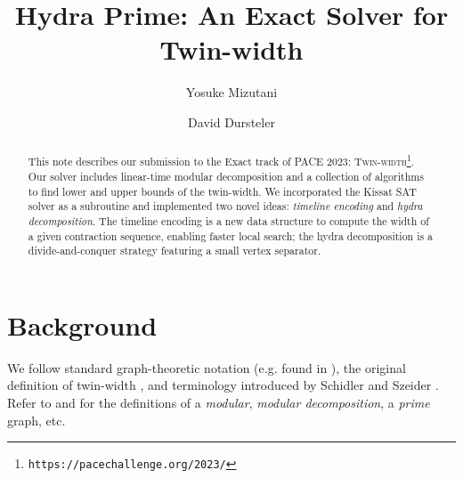 \documentclass[a4paper,UKenglish,cleveref, autoref, thm-restate]{lipics-v2021}
\title{Hydra Prime: An Exact Solver for Twin-width} %
\author{Yosuke Mizutani}{\universityOfUtah}{yos@cs.utah.edu}{https://orcid.org/0000-0002-9847-4890}{}
\author{David Dursteler}{\universityOfUtah}{u1161522@utah.edu}{https://orcid.org/0009-0000-6471-1504}{}
\begin{document}
\maketitle

\begin{abstract}
This note describes our submission to the Exact track of PACE 2023:
 \textsc{Twin-width}\footnote{%
\texttt{https://pacechallenge.org/2023/}}.
%
Our solver includes linear-time modular decomposition and
a collection of algorithms to find lower and upper bounds of the twin-width.
%
We incorporated the \textsf{Kissat} SAT solver \cite{biere_gimsatul_2022} as a subroutine
and implemented two novel ideas:
\emph{timeline encoding} and \emph{hydra decomposition}.
%
The timeline encoding is a new data structure to compute the width of a given contraction
sequence, enabling faster local search;
the hydra decomposition is a divide-and-conquer strategy featuring a small vertex separator.
\end{abstract}

\section{Background}
\label{sec:background}

We follow standard graph-theoretic notation (e.g. found in \cite{diestel2017graph}),
the original definition of twin-width \cite{bonnet_twin-width_2020,bonnet_twin-width_2021,
bonnet_twin-width_2021-1},
and terminology introduced by Schidler and Szeider \cite{schidler_sat_2021}.
%
Refer to \cite{habib_survey_2010} and \cite{tedder_simple_2008} for the definitions of
a \emph{modular}, \emph{modular decomposition}, a \emph{prime} graph, etc.
\end{document}
